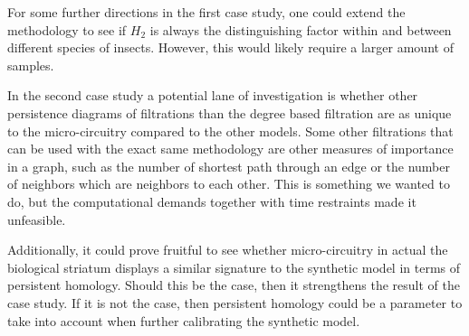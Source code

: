 For some further directions in the first case study, one could extend the methodology to see if $H_{2}$ is always the distinguishing factor within and between different species of insects. However, this would likely require a larger amount of samples.

In the second case study a potential lane of investigation is whether other persistence diagrams of filtrations than the degree based filtration are as unique to the micro-circuitry compared to the other models. Some other filtrations that can be used with the exact same methodology are other measures of importance in a graph, such as the number of shortest path through an edge or the number of neighbors which are neighbors to each other. This is something we wanted to do, but the computational demands together with time restraints made it unfeasible.

Additionally, it could prove fruitful to see whether micro-circuitry in actual the biological striatum displays a similar signature to the synthetic model in terms of persistent homology. Should this be the case, then it strengthens the result of the case study. If it is not the case, then persistent homology could be a parameter to take into account when further calibrating the synthetic model.

